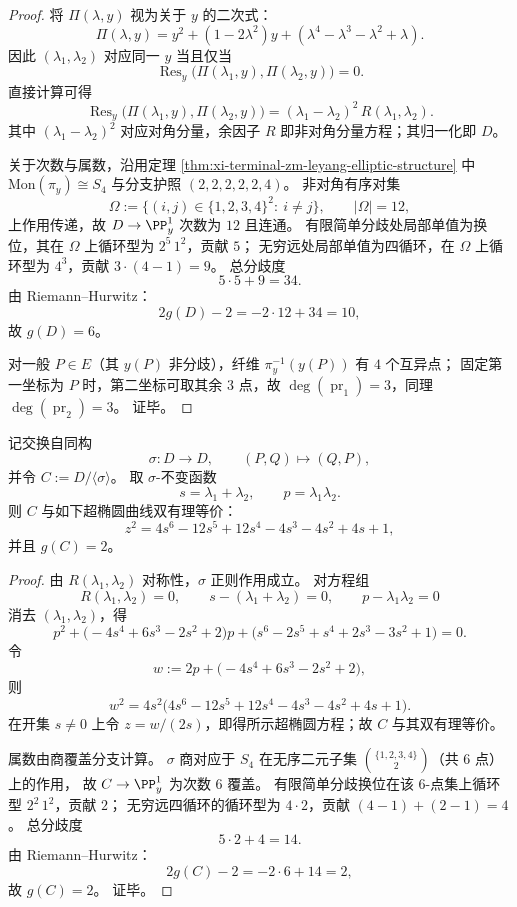 \begin{proof}
将 \(\Pi(\lambda,y)\) 视为关于 \(y\) 的二次式：
\[
\Pi(\lambda,y)=y^2+(1-2\lambda^2)y+(\lambda^4-\lambda^3-\lambda^2+\lambda).
\]
因此 \((\lambda_1,\lambda_2)\) 对应同一 \(y\) 当且仅当
\[
\operatorname{Res}_{y}\bigl(\Pi(\lambda_1,y),\Pi(\lambda_2,y)\bigr)=0.
\]
直接计算可得
\[
\operatorname{Res}_{y}\bigl(\Pi(\lambda_1,y),\Pi(\lambda_2,y)\bigr)
=(\lambda_1-\lambda_2)^2\,R(\lambda_1,\lambda_2).
\]
其中 \((\lambda_1-\lambda_2)^2\) 对应对角分量，余因子 \(R\) 即非对角分量方程；其归一化即 \(D\)。

关于次数与属数，沿用定理 \ref{thm:xi-terminal-zm-leyang-elliptic-structure} 中 \(\mathrm{Mon}(\pi_y)\cong S_4\) 与分支护照 \((2,2,2,2,2,4)\)。
非对角有序对集
\[
\Omega:=\{(i,j)\in\{1,2,3,4\}^2:\ i\neq j\},
\qquad |\Omega|=12,
\]
上作用传递，故 \(D\to\PP^1_y\) 次数为 \(12\) 且连通。
有限简单分歧处局部单值为换位，其在 \(\Omega\) 上循环型为 \(2^5\,1^2\)，贡献 \(5\)；
无穷远处局部单值为四循环，在 \(\Omega\) 上循环型为 \(4^3\)，贡献 \(3\cdot(4-1)=9\)。
总分歧度
\[
5\cdot 5+9=34.
\]
由 Riemann--Hurwitz：
\[
2g(D)-2=-2\cdot 12+34=10,
\]
故 \(g(D)=6\)。

对一般 \(P\in E\)（其 \(y(P)\) 非分歧），纤维 \(\pi_y^{-1}(y(P))\) 有 \(4\) 个互异点；
固定第一坐标为 \(P\) 时，第二坐标可取其余 \(3\) 点，故 \(\deg(\operatorname{pr}_1)=3\)，同理 \(\deg(\operatorname{pr}_2)=3\)。
证毕。
\end{proof}

\begin{proposition}\label{prop:conclusion-leyang-symmetric-quotient-genus2}
记交换自同构
\[
\sigma:D\to D,\qquad (P,Q)\mapsto (Q,P),
\]
并令 \(C:=D/\langle \sigma\rangle\)。
取 \(\sigma\)-不变函数
\[
s=\lambda_1+\lambda_2,\qquad p=\lambda_1\lambda_2.
\]
则 \(C\) 与如下超椭圆曲线双有理等价：
\[
z^2=4s^6-12s^5+12s^4-4s^3-4s^2+4s+1,
\]
并且 \(g(C)=2\)。
\end{proposition}
\begin{proof}
由 \(R(\lambda_1,\lambda_2)\) 对称性，\(\sigma\) 正则作用成立。
对方程组
\[
R(\lambda_1,\lambda_2)=0,\qquad
s-(\lambda_1+\lambda_2)=0,\qquad
p-\lambda_1\lambda_2=0
\]
消去 \((\lambda_1,\lambda_2)\)，得
\[
p^2+\bigl(-4s^4+6s^3-2s^2+2\bigr)p+\bigl(s^6-2s^5+s^4+2s^3-3s^2+1\bigr)=0.
\]
令
\[
w:=2p+\bigl(-4s^4+6s^3-2s^2+2\bigr),
\]
则
\[
w^2=4s^2\bigl(4s^6-12s^5+12s^4-4s^3-4s^2+4s+1\bigr).
\]
在开集 \(s\neq 0\) 上令 \(z=w/(2s)\)，即得所示超椭圆方程；故 \(C\) 与其双有理等价。

属数由商覆盖分支计算。
\(\sigma\) 商对应于 \(S_4\) 在无序二元子集 \(\binom{\{1,2,3,4\}}{2}\)（共 \(6\) 点）上的作用，
故 \(C\to\PP^1_y\) 为次数 \(6\) 覆盖。
有限简单分歧换位在该 \(6\)-点集上循环型 \(2^2\,1^2\)，贡献 \(2\)；
无穷远四循环的循环型为 \(4\cdot 2\)，贡献 \((4-1)+(2-1)=4\)。
总分歧度
\[
5\cdot 2+4=14.
\]
由 Riemann--Hurwitz：
\[
2g(C)-2=-2\cdot 6+14=2,
\]
故 \(g(C)=2\)。
证毕。
\end{proof}

